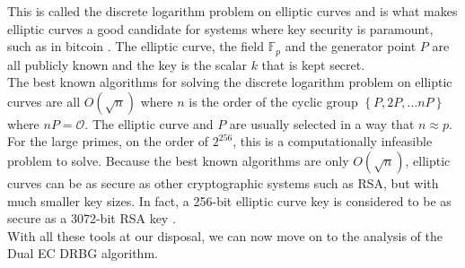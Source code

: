 This is called the discrete logarithm problem on elliptic curves and is what makes elliptic curves a good candidate for systems where key security is paramount, such as in bitcoin \cite{wang2018ecdsa}. The elliptic curve, the field $\mathbb{F}_p$ and the generator point $P$ are all publicly known and the key is the scalar $k$ that is kept secret.
\\

The best known algorithms for solving the discrete logarithm problem on elliptic curves are all $O(\sqrt{n})$ where $n$ is the order of the cyclic group $\left\{P, 2P, \dots nP \right\}$ where $nP = \mathcal{O}$. The elliptic curve and $P$ are usually selected in a way that $n \approx p$. For the large primes, on the order of $2^{256}$, this is a computationally infeasible problem to solve. Because the best known algorithms are only $O(\sqrt{n})$, elliptic curves can be as secure as other cryptographic systems such as RSA, but with much smaller key sizes. In fact, a 256-bit elliptic curve key is considered to be as secure as a 3072-bit RSA key \cite{elliptic_curve_cryptography}.
\\

With all these tools at our disposal, we can now move on to the analysis of the Dual EC DRBG algorithm.